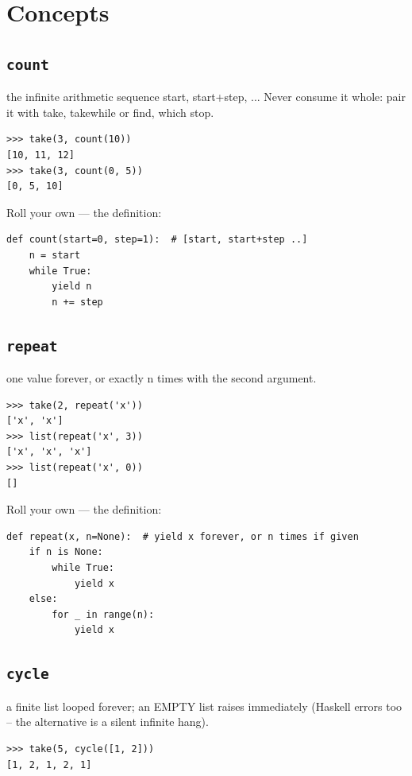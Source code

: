 \documentclass[10pt,letterpaper]{book}
\begin{document}
\section{Concepts}
\subsection{\texttt{count}}\label{def:count}
the infinite arithmetic sequence start, start+step, ... Never consume it whole: pair it with take, takewhile or find, which stop.
\begin{lstlisting}[style=ex]
>>> take(3, count(10))
[10, 11, 12]
>>> take(3, count(0, 5))
[0, 5, 10]
\end{lstlisting}

Roll your own --- the definition:

\begin{lstlisting}[style=ex]
def count(start=0, step=1):  # [start, start+step ..]
    n = start
    while True:
        yield n
        n += step
\end{lstlisting}

\subsection{\texttt{repeat}}\label{def:repeat}
one value forever, or exactly n times with the second argument.
\begin{lstlisting}[style=ex]
>>> take(2, repeat('x'))
['x', 'x']
>>> list(repeat('x', 3))
['x', 'x', 'x']
>>> list(repeat('x', 0))
[]
\end{lstlisting}

Roll your own --- the definition:

\begin{lstlisting}[style=ex]
def repeat(x, n=None):  # yield x forever, or n times if given
    if n is None:
        while True:
            yield x
    else:
        for _ in range(n):
            yield x
\end{lstlisting}

\subsection{\texttt{cycle}}\label{def:cycle}
a finite list looped forever; an EMPTY list raises immediately (Haskell errors too -- the alternative is a silent infinite hang).
\begin{lstlisting}[style=ex]
>>> take(5, cycle([1, 2]))
[1, 2, 1, 2, 1]
\end{lstlisting}
\end{document}
